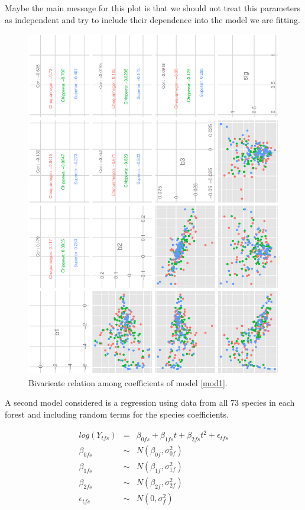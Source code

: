 \documentclass{article}
\begin{document}
Maybe the main message for this plot is that we should not treat this parameters as independent and try to include their dependence into the model we are fitting. 
\begin{figure}[h!]
\centering
\includegraphics[scale=.6, angle=-90]{scat_m1.ps}
\caption{Bivarieate relation among coefficients of model \ref{mod1}. \label{pairs1}}
\end{figure}

A second model considered is a regression using data from all 73 species in each forest and including random terms for the species coefficients. 

\begin{eqnarray}
\nonumber log(Y_{tfs}) &=&  \beta_{0fs} + \beta_{1fs}t + \beta_{2fs}t^2 + \epsilon_{tfs}  \\
\nonumber \beta_{0fs} &\sim& N(\beta_{0f}, \sigma_{0f}^2 ) \\ 
\nonumber \beta_{1fs} &\sim& N(\beta_{1f}, \sigma_{1f}^2 ) \\ 
\nonumber \beta_{2fs} &\sim& N(\beta_{2f}, \sigma_{2f}^2 ) \\ 
\epsilon_{tfs} &\sim& N(0,\sigma_f^2)
\label{mod2}
\end{eqnarray}
\end{document}
